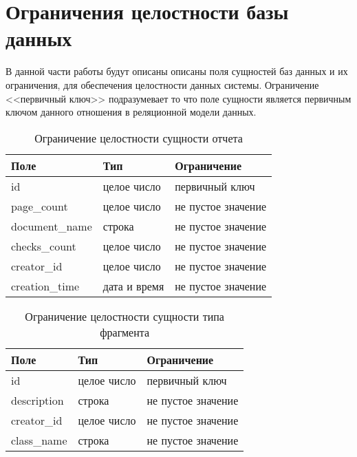 \section{Ограничения целостности базы данных}
В данной части работы будут описаны описаны поля сущностей баз данных и их ограничения, для обеспечения целостности данных системы. Ограничение <<первичный ключ>> подразумевает то что поле сущности является первичным ключом данного отношения в реляционной модели данных.
\begin{table}[htbp]
	\centering
	\caption{Ограничение целостности сущности отчета}
	\begin{tabularx}{\textwidth}{|X|X|X|}
		\hline
		Поле & Тип & Ограничение \\
		\hline
		id & целое число & первичный ключ \\
		\hline
		page\_count & целое число & не пустое значение\\
		\hline
		document\_name & строка & не пустое значение\\
		\hline
		checks\_count & целое число & не пустое значение\\
		\hline
		creator\_id & целое число & не пустое значение\\
		\hline
		creation\_time & дата и время & не пустое значение\\
		\hline
	\end{tabularx}

	\label{t:documents_cons}
\end{table}

\begin{table}[htbp]
	\centering
	\caption{Ограничение целостности сущности типа фрагмента}
	\begin{tabularx}{\textwidth}{|X|X|X|}
		\hline
		Поле & Тип & Ограничение \\
		\hline
	  	id & целое число & первичный ключ \\
	  	\hline
		description & строка & не пустое значение \\
		\hline
		creator\_id & целое число & не пустое значение\\
		\hline
		class\_name & строка & не пустое значение\\
		\hline
	\end{tabularx}
	
	\label{t:markup_type_cons}
\end{table}

